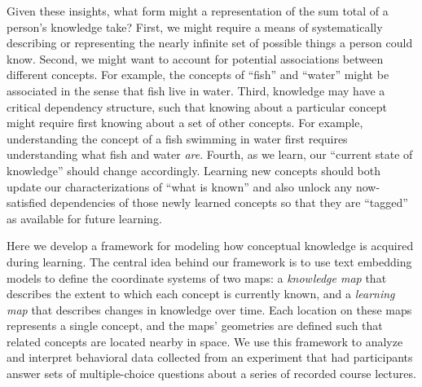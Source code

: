 \documentclass[10pt]{article}
\providecommand{\DIFaddtex}[1]{{\protect\color{blue}\uwave{#1}}} %
\providecommand{\DIFaddbegin}{} %
\providecommand{\DIFaddend}{} %
\providecommand{\DIFadd}[1]{\texorpdfstring{\DIFaddtex{#1}}{#1}} %
\newcommand{\DIFaddincludegraphics}[2][]{{\color{blue}\fbox{\DIFOincludegraphics[#1]{#2}}}} %
\DeclareRobustCommand{\DIFaddbegin}{\DIFOaddbegin \let\includegraphics\DIFaddincludegraphics} %
\DeclareRobustCommand{\DIFaddend}{\DIFOaddend \let\includegraphics\DIFOincludegraphics} %
\begin{document}
Given these insights, what form might a representation of the sum total of a
person's knowledge take? First, we might require a means of
systematically describing or representing \DIFaddbegin \DIFadd{(at least some subset of) }\DIFaddend the nearly infinite set of possible
things a person could know. Second, we might want to account for potential
associations between different concepts. For example, the concepts of ``fish''
and ``water'' might be associated in the sense that fish live in water. Third,
knowledge may have a critical dependency structure, such that knowing about a
particular concept might require first knowing about a set of other concepts.
For example, understanding the concept of a fish swimming in water first
requires understanding what fish and water \textit{are}. Fourth, as we learn,
our ``current state of knowledge'' should change accordingly. Learning new
concepts should both update our characterizations of ``what is known'' and also
unlock any now-satisfied dependencies of those newly learned concepts so that
they are ``tagged'' as available for future learning.

Here we develop a framework for modeling how conceptual knowledge is acquired
during learning. The central idea behind our framework is to use text embedding
models to define the coordinate systems of two maps: a \textit{knowledge
map} that describes the extent to which each concept is currently known, and
a \textit{learning map} that describes changes in knowledge over time. Each
location on these maps represents a single concept, and the maps' geometries
are defined such that related concepts are located nearby in space. We use this
framework to analyze and interpret behavioral data collected from an experiment
that had participants answer sets of multiple-choice questions about a series of
recorded course lectures.
\end{document}
